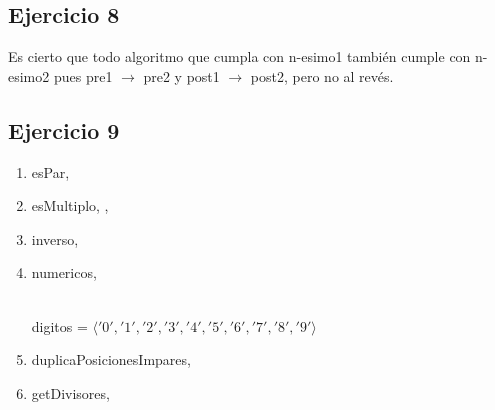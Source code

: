 \subsection{Ejercicio 8}
Es cierto que todo algoritmo que cumpla con n-esimo1 también cumple con n-esimo2 pues pre1 $\rightarrow$ pre2 y post1
$\rightarrow$ post2, pero no al revés.

\subsection{Ejercicio 9}
\begin{enumerate}[label=(\alph*)]
    \item   \begin{proc}{esPar}{, }{}
    \end{proc}
    \item   \begin{proc}{esMultiplo}{, , }{}
    \end{proc}
    \item   \begin{proc}{inverso}{, }{}
    \end{proc}
    \item   \begin{proc}{numericos}{, }{}
    \end{proc}\\
    digitos = $\langle '0', '1', '2', '3', '4', '5', '6', '7', '8', '9' \rangle$
    \item   \begin{proc}{duplicaPosicionesImpares}{, }{}
    \end{proc}
    \item   \begin{proc}{getDivisores}{, }{}
    \end{proc}
\end{enumerate}

